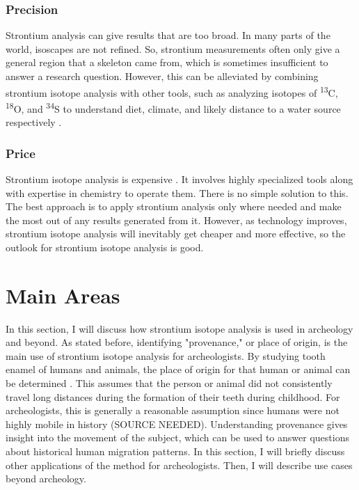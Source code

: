\documentclass[a4paper, 12pt]{article}
\begin{document}
\subsubsection{Precision}
Strontium analysis can give results that are too broad. In many parts of the world, isoscapes are not
refined.
So, strontium measurements often only give a general region that
a skeleton came from, which is sometimes insufficient to answer a research question.
However, this can be alleviated by combining strontium isotope analysis with other tools,
such as analyzing isotopes of \textsuperscript{13}C, \textsuperscript{18}O, and \textsuperscript{34}S
to understand diet, climate, and likely distance to a water source respectively \citep{madgwick2019}.

\subsubsection{Price}
Strontium isotope analysis is expensive \citep{holt2021}. It involves highly specialized tools along
with expertise in chemistry to operate them. There is no simple solution to this.
The best approach is to apply strontium analysis only where needed and make the most
out of any results generated from it. However, as technology improves, strontium
isotope analysis will inevitably get cheaper and more effective, so the outlook
for strontium isotope analysis is good.




\section{Main Areas}
In this section, I will discuss how strontium isotope analysis is used in archeology and beyond.
As stated before, identifying "provenance," or place of origin, is the main use of
strontium isotope analysis for archeologists. By studying tooth enamel of humans and animals, the place of origin for that human
or animal can be determined \citep{holt2021}. This assumes that the person or animal did not
consistently travel long distances during the formation of their teeth during childhood. For archeologists, this is generally
a reasonable assumption since humans were not highly mobile in history (SOURCE NEEDED).
Understanding provenance gives insight into the movement of the subject, which can
be used to answer questions about historical human migration patterns. In this section, I will briefly discuss other
applications of the method for archeologists. Then, I will describe use cases beyond archeology.
\end{document}

